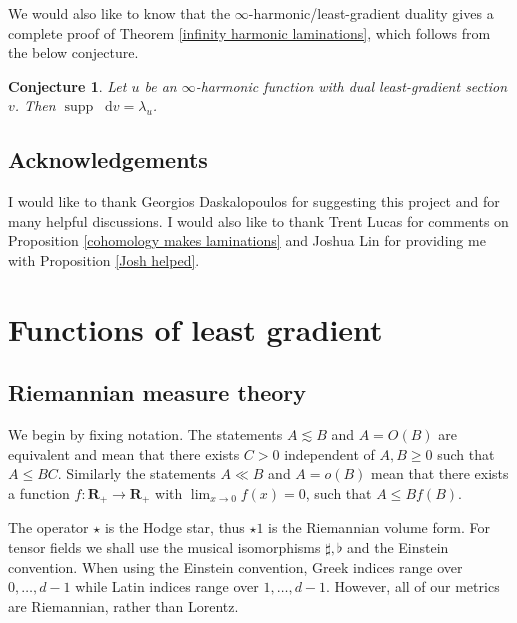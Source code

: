 \documentclass[reqno,12pt,letterpaper]{amsart}
\newcommand{\RR}{\mathbf{R}}
\DeclareMathOperator{\supp}{supp}
\newcommand*\dif{\mathop{}\!\mathrm{d}}
\newtheorem{conjecture}[theorem]{Conjecture}
\theoremstyle{definition}
\numberwithin{equation}{section}
\begin{document}
We would also like to know that the $\infty$-harmonic/least-gradient duality gives a complete proof of Theorem \ref{infinity harmonic laminations}, which follows from the below conjecture.

\begin{conjecture}\label{two laminations agree}
Let $u$ be an $\infty$-harmonic function with dual least-gradient section $v$.
Then $\supp \dif v = \lambda_u$.
\end{conjecture}



\subsection{Acknowledgements}
I would like to thank Georgios Daskalopoulos for suggesting this project and for many helpful discussions.
I would also like to thank Trent Lucas for comments on Proposition \ref{cohomology makes laminations} and Joshua Lin for providing me with Proposition \ref{Josh helped}.




\section{Functions of least gradient}\label{LeastGradientFunctions}
\subsection{Riemannian measure theory}
We begin by fixing notation.
The statements $A \lesssim B$ and $A = O(B)$ are equivalent and mean that there exists $C > 0$ independent of $A, B \geq 0$ such that $A \leq BC$.
Similarly the statements $A \ll B$ and $A = o(B)$ mean that there exists a function $f: \RR_+ \to \RR_+$ with $\lim_{x \to 0} f(x) = 0$, such that $A \leq Bf(B)$.

The operator $\star$ is the Hodge star, thus $\star 1$ is the Riemannian volume form.
For tensor fields we shall use the musical isomorphisms $\sharp, \flat$ and the Einstein convention.
When using the Einstein convention, Greek indices range over $0, \dots, d - 1$ while Latin indices range over $1, \dots, d - 1$.
However, all of our metrics are Riemannian, rather than Lorentz.
\end{document}
